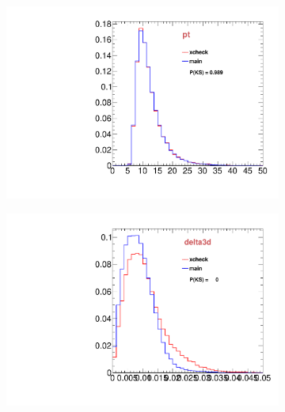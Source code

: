 \begin{figure}
\begin{subfigure}[b]{0.2\textwidth}
                \includegraphics[width=\textwidth]{Figures/VariablesComparison/Data_endcaps_figs/pt}
                \label{fig:Data_endcaps_pt}
        \end{subfigure}
        \begin{subfigure}[b]{0.2\textwidth}
                \centering
                \includegraphics[width=\textwidth]{Figures/VariablesComparison/Data_endcaps_figs/pvip}
                \label{fig:Data_endcaps_pvip}
        \end{subfigure}
        \begin{subfigure}[b]{0.2\textwidth}
                \centering

\end{subfigure}
\end{figure}

